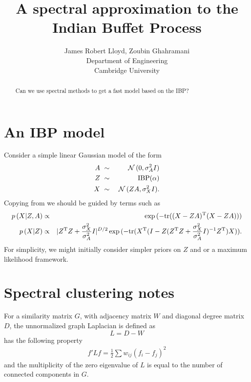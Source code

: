 \documentclass{article}
\title{
A spectral approximation to the Indian Buffet Process
}
\author{
James Robert Lloyd, Zoubin Ghahramani\\
Department of Engineering\\
Cambridge University\\
}
\numberwithin{equation}{section}
\numberwithin{thm}{section}
\def\IBP{Z}
\def\Weights{A}
\def\Data{X}
\def\Graph{G}
\def\Adjacency{W}
\def\Degree{D}
\def\Laplacian{L}
\def\IBPPrior{\alpha}
\begin{document}
\maketitle

\begin{abstract}
Can we use spectral methods to get a fast model based on the IBP?
\end{abstract}

\section{An IBP model}

Consider a simple linear Gaussian model of the form
\begin{eqnarray}
\Weights & \dist & \Normal\,(0, \sigma_\Weights^2 I) \\
\IBP & \dist & \textrm{IBP}(\IBPPrior) \\
\Data & \dist & \Normal\,(\IBP \Weights, \sigma_\Data^2 I).
\end{eqnarray}
Copying from \cite{Griffiths2011} we should be guided by terms such as
\begin{eqnarray}
p\,(\Data | \IBP, \Weights) & \propto & \exp\,(-\textrm{tr}((\Data - \IBP\Weights)\Transpose(\Data - \IBP\Weights))) \\
p\,(\Data | \IBP) & \propto & |\IBP\Transpose\IBP + \frac{\sigma_\Data^2}{\sigma_\Weights^2}I|^{D/2} \exp\,(-\textrm{tr}(\Data\Transpose(I - \IBP(\IBP\Transpose\IBP + \frac{\sigma_\Data^2}{\sigma_\Weights^2}I)^{-1}\IBP\Transpose)\Data)).
\end{eqnarray}
For simplicity, we might initially consider simpler priors on $\IBP$ and or a maximum likelihood framework.
\section{Spectral clustering notes}

For a similarity matrix $\Graph$, with adjacency matrix $\Adjacency$ and diagonal degree matrix $\Degree$, the unnormalized graph Laplacian is defined as
\begin{equation}
\Laplacian = \Degree - \Adjacency
\end{equation}
has the following property \citep{Luxburg2007}
\begin{eqnarray}
f' \Laplacian f = \frac{1}{2}\sum w_{ij}(f_i - f_j)^2
\end{eqnarray}
and the multiplicity of the zero eigenvalue of $\Laplacian$ is equal to the number of connected components in $\Graph$.
\end{document}
